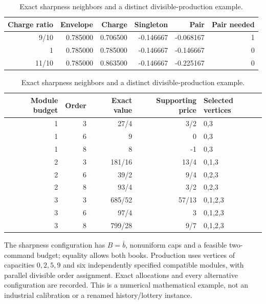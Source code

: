 \begin{table}[p]\centering\small\setlength{\tabcolsep}{3pt}
\caption{Exact sharpness neighbors and a distinct divisible-production example.}\label{tab:production54}
\begin{tabular}{rrrrrr}\toprule
Charge ratio & Envelope & Charge & Singleton & Pair & Pair needed\\\midrule
9/10 & 0.785000 & 0.706500 & -0.146667 & -0.068167 & 1\\
1 & 0.785000 & 0.785000 & -0.146667 & -0.146667 & 0\\
11/10 & 0.785000 & 0.863500 & -0.146667 & -0.225167 & 0\\
\bottomrule\end{tabular}\par\medskip
\begin{tabular}{rrrrl}\toprule Module budget & Order & Exact value & Supporting price & Selected vertices\\\midrule
1 & 3 & 27/4 & 3/2 & 0,3\\
1 & 6 & 9 & 0 & 0,3\\
1 & 8 & 8 & -1 & 0,3\\
2 & 3 & 181/16 & 13/4 & 0,1,3\\
2 & 6 & 39/2 & 9/4 & 0,2,3\\
2 & 8 & 93/4 & 3/2 & 0,2,3\\
3 & 3 & 685/52 & 57/13 & 0,1,2,3\\
3 & 6 & 97/4 & 3 & 0,1,2,3\\
3 & 8 & 799/28 & 9/7 & 0,1,2,3\\
\bottomrule\end{tabular}
\par\smallskip\begin{minipage}{0.98\textwidth}\small The sharpness configuration has $B=\bar b$, nonuniform caps and a feasible two-command budget; equality allows both books. Production uses vertices of capacities $0,2,5,9$ and six independently specified compatible modules, with parallel divisible order assignment. Exact allocations and every alternative configuration are recorded. This is a numerical mathematical example, not an industrial calibration or a renamed history/lottery instance.\end{minipage}\end{table}\clearpage
